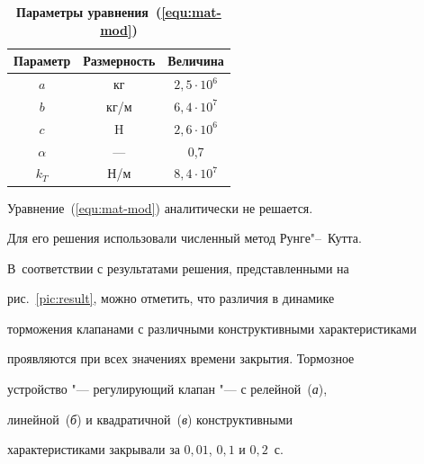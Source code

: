 \begin{table} \small 

\centering \caption*{\bf Параметры уравнения~(\ref{equ:mat-mod})} \vspace{-3mm}

\begin{tabular}{c|c|c}

      \hline

\footnotesize Параметр&

\footnotesize Размерность&

\footnotesize Величина\\

      \hline

\rule{0mm}{12pt}%

      $a$           &кг        &$2,5\cdot 10^{6}$\\

      $b$           &кг/м      &$6,4\cdot 10^{7}$\\

      $c$           &H         &$2,6\cdot 10^{6}$\\

      $\alpha$      &---         &0,7\\

      $k_{T}$       &Н/м       &$8,4\cdot 10^{7}$\\

      \hline

\end{tabular}

\end{table}



Уравнение~(\ref{equ:mat-mod}) аналитически не решается. 

Для его решения использовали численный метод Рунге"--~Кутта. 

В~соответствии с результатами решения, представленными на

рис.~\ref{pic:result}, можно отметить, что различия в динамике

торможения клапанами с различными конструктивными характеристиками

проявляются при всех значениях времени закрытия. Тормозное

устройство "--- регулирующий клапан "--- с релейной~({\sl а}),

линейной~({\sl б}) и квадратичной~({\sl в}) конструктивными

характеристиками закрывали за $0,01$, $0,1$ и $0,2$~с.



